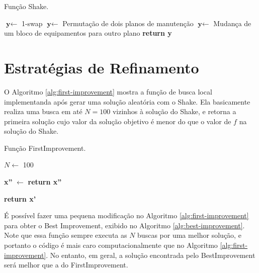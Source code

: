 \documentclass[
	12pt,				%
	oneside,			%
	a4paper,			%
	chapter=TITLE,
	sumario=tradicional,
	english,			%
	brazil				%
]{abntex2}
\begin{document}
\begin{algorithm}[H]
	\caption{Função Shake.}\label{alg:shake}
	\begin{algorithmic}[1]
			\State $\textbf{y} \gets$ 1-swap
		\EndIf
			\State $\textbf{y} \gets$ Permutação de dois planos de manutenção
		\EndIf
			\State $\textbf{y} \gets$ Mudança de um bloco de equipamentos para outro plano
		\EndIf
	\Statex
	\State \textbf{return y} 

	\EndProcedure 
	\end{algorithmic}
\end{algorithm}

\section{Estratégias de Refinamento}

O Algoritmo \ref{alg:first-improvement} mostra a função de busca local
implementanda após gerar uma solução aleatória com o Shake. Ela basicamente 
realiza uma busca em até $N = 100$ vizinhos à solução do Shake, e retorna a primeira 
solução cujo valor da solução objetivo é menor do que o valor de $f$ na 
solução do Shake. 

\begin{algorithm}[H]
	\caption{Função FirstImprovement.}\label{alg:first-improvement}

	\begin{algorithmic}[1]

	\State $N\gets$ 100 

		\State \textbf{x''} $\gets$  
			\State \textbf{return x''} 
		\EndIf
	\EndFor
		
	\Statex
	\State \textbf{return x'} 
	\EndProcedure 
	\end{algorithmic}
\end{algorithm}

É possível fazer uma pequena modificação no Algoritmo \ref{alg:first-improvement} 
para obter o Best Improvement, exibido no Algoritmo \ref{alg:best-improvement}. 
Note que essa função sempre executa as $N$ buscas por uma melhor solução, e 
portanto o código é mais caro computacionalmente que no Algoritmo \ref{alg:first-improvement}.
No entanto, em geral, a solução encontrada pelo BestImprovement será melhor que a 
do FirstImprovement.
\end{document}

